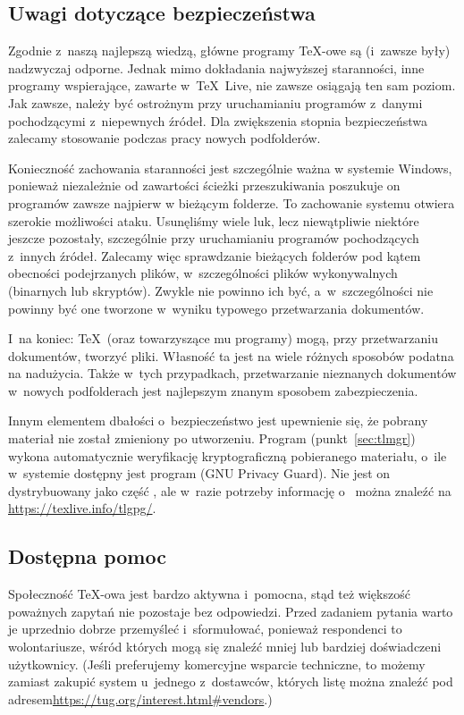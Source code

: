 \documentclass{article}
\begin{document}
\subsection{Uwagi dotyczące bezpieczeństwa}
\label{sec:security}

Zgodnie z~naszą najlepszą wiedzą, główne programy \TeX-owe są
(i~zawsze były) nadzwyczaj odporne. Jednak mimo dokładania najwyższej
staranności, inne programy wspierające, zawarte w~\TeX\ Live, nie
zawsze osiągają ten sam poziom. Jak zawsze, należy być
ostrożnym przy uruchamianiu programów z~danymi pochodzącymi
z~niepewnych źródeł. Dla zwiększenia stopnia
bezpieczeństwa zalecamy stosowanie podczas pracy nowych podfolderów.

Konieczność zachowania staranności jest szczególnie ważna w systemie
Windows, ponieważ niezależnie od zawartości ścieżki przeszukiwania
poszukuje on programów zawsze najpierw w bieżącym folderze. To
zachowanie systemu otwiera szerokie możliwości ataku. Usunęliśmy
wiele luk, lecz niewątpliwie niektóre jeszcze pozostały, szczególnie
przy uruchamianiu programów pochodzących z~innych źródeł.  Zalecamy
więc sprawdzanie bieżących folderów pod kątem obecności podejrzanych
plików, w~szczególności plików wykonywalnych (binarnych lub
skryptów). Zwykle nie powinno ich być, a~w~szczególności nie
powinny być one tworzone w~wyniku typowego przetwarzania dokumentów.

I~na koniec: \TeX\ (oraz towarzyszące mu programy) mogą, przy przetwarzaniu
dokumentów, tworzyć pliki. Własność ta jest na wiele różnych sposobów podatna
na nadużycia. Także w~tych przypadkach, przetwarzanie nieznanych dokumentów
w~nowych podfolderach jest najlepszym znanym sposobem zabezpieczenia.

Innym elementem dbałości o~bezpieczeństwo jest upewnienie się, że pobrany materiał
nie został zmieniony po utworzeniu. Program  (punkt~\ref{sec:tlmgr})
wykona automatycznie weryfikację kryptograficzną pobieranego materiału, o~ile
w~systemie dostępny jest program  (GNU Privacy Guard). Nie jest
on dystrybuowany jako część \TL, ale w~razie potrzeby informację o~ można znaleźć na
\url{https://texlive.info/tlgpg/}.

\subsection{Dostępna pomoc}
\label{sec:help}

Społeczność \TeX-owa jest bardzo aktywna i~pomocna, stąd też większość
poważnych zapytań nie pozostaje bez odpowiedzi. Przed zadaniem
pytania warto je uprzednio dobrze przemyśleć i~sformułować, ponieważ
respondenci to wolontariusze, wśród których mogą się znaleźć mniej lub
bardziej doświadczeni użytkownicy.
(Jeśli preferujemy komercyjne wsparcie techniczne, to możemy zamiast
\TL{} zakupić system u~jednego z~dostawców, których listę można znaleźć
pod adresem\newline \url{https://tug.org/interest.html#vendors}.)
\end{document}
